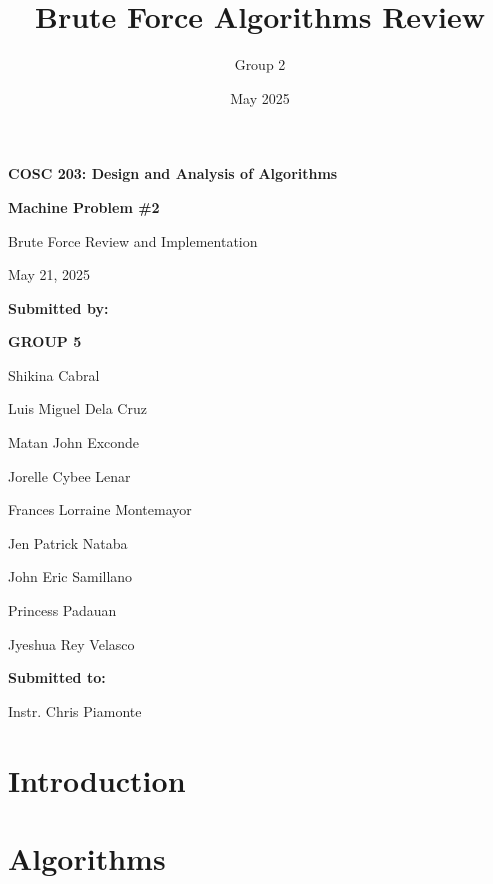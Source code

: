 \documentclass[a4paper, 11pt]{article}
\title{\textbf{Brute Force Algorithms Review}}
\author{Group 2}
\date{May 2025}
\begin{document}
\begin{titlepage}
    \centering
    \vspace*{2cm}

    {\Large \textbf{COSC 203: Design and Analysis of Algorithms} \par}
    \vspace{1cm}

    {\LARGE \textbf{Machine Problem \#2} \par}
    \vspace{0.5cm}
    
    {\Large Brute Force Review and Implementation \par}
    \vspace{2cm}

    {\large May 21, 2025 \par}
    \vspace{2cm}

    {\large \textbf{Submitted by:} \par}
    {\large \textbf{GROUP 5} \par}
    {\large Shikina Cabral \par}    
    {\large Luis Miguel Dela Cruz \par}
    {\large Matan John Exconde \par}
    {\large Jorelle Cybee Lenar \par}
    {\large Frances Lorraine Montemayor \par}
    {\large Jen Patrick Nataba \par}
    {\large John Eric Samillano \par}
    {\large Princess Padauan \par}
    {\large Jyeshua Rey Velasco \par}
    \vspace{1cm}

    {\large \textbf{Submitted to:} \par}
    {\large Instr. Chris Piamonte \par}

\end{titlepage}

\tableofcontents
\pagebreak
\section{Introduction}


\section{Algorithms}
\end{document}

